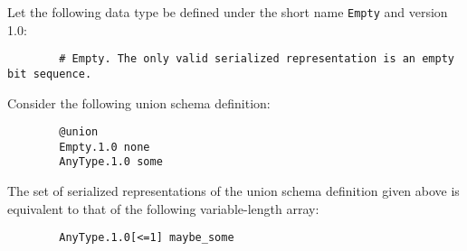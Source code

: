 \begin{remark}
    Let the following data type be defined under the short name \verb|Empty| and version 1.0:

    \begin{verbatim}
        # Empty. The only valid serialized representation is an empty bit sequence.
    \end{verbatim}

    Consider the following union schema definition:

    \begin{verbatim}
        @union
        Empty.1.0 none
        AnyType.1.0 some
    \end{verbatim}

    The set of serialized representations of the union schema definition given above is equivalent to
    that of the following variable-length array:

    \begin{verbatim}
        AnyType.1.0[<=1] maybe_some
    \end{verbatim}
\end{remark}
